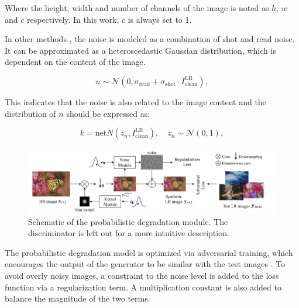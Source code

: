            Where the height, width and number of channels of the image is noted as $h$, $w$ and $c$ respectively. 
            In this work, $c$ is always set to 1.

            In other methods \cite{plotz2017benchmarking}, the noise is modeled as a combination of shot and read noise. 
            It can be approximated as a heteroscedastic Gaussian distribution, which is dependent on the content of the image.

            \begin{equation}
                n \sim \mathcal{N}(0, \sigma_{\text{read}} + \sigma_{\text{shot}} \cdot I^{\text{LR}}_{\text{clean}}),
            \end{equation}

            This indicates that the noise is also related to the image content and the distribution of $n$ should be expressed as:


            \begin{equation}
                k = \text{net}N(z_n,I^{\text{LR}}_{\text{clean}}), \quad z_n \sim \mathcal{N}(0,1),
            \end{equation}

            \begin{figure}[h!]
                \centering
                \includegraphics[scale=0.38]{Includes/3-probabilistic-degradation-model.png}
                \caption{Schematic of the probabilistic degradation module.
                         The discriminator is left out for a more intuitive description.}
                \label{fig:3-probabilistic-degradation-model}
            \end{figure}

            The probabilistic degradation model is optimized via adversarial training, which encourages the output of the generator to be similar with the test images \cite{bulat2018learn}.
            To avoid overly noisy images, a constraint to the noise level is added to the loss function via a regularization term. 
            A multiplication constant is also added to balance the magnitude of the two terms.

